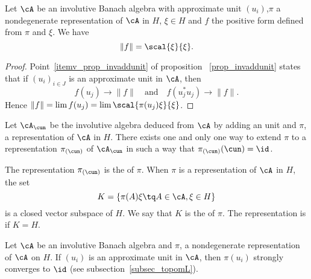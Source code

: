 \begin{proposition}
Let $\cA$ be an involutive Banach algebra with approximate unit $(u_i)$,$\pi$ a nondegenerate representation of $\cA$ in $H$, $\xi\in H$ and $f$ the positive form defined from $\pi$ and $\xi$. We have
\begin{equation}
\| f \|=\scal{ \xi }{ \xi }.
\end{equation}
\end{proposition}

\begin{proof}
Point~\ref{itemv_prop_invaddunit} of proposition ~\ref{prop_invaddunit} states that if $(u_i)_{i\in J}$ is an approximate unit in $\cA$, then
\[
  f(u_j)\to\| f \|\quad\text{and}\quad f(u_j^*u_j)\to \| f \|.
\]
Hence $\| f \|=\lim f(u_j)=\lim\scal{ \pi(u_j)\xi }{ \xi }$.

\end{proof}

\begin{proposition}
Let $\cA_{\cun}$ be the involutive algebra deduced from $\cA$ by adding an unit and $\pi$, a representation of $\cA$ in $H$. There exists one and only one way to extend $\pi$ to a representation $\pi_{(\cun)}$ of $\cA_{\cun}$ in such a way that $\pi_{(\cun)}(\cun)=\id$.
\end{proposition}
The representation $\pi_{(\cun)}$ is the  of $\pi$. When $\pi$ is a representation of $\cA$ in $H$, the set
\begin{equation}
 K=\{ \pi(A)\xi\tq A\in\cA,\xi\in H \}
\end{equation}
is a closed vector subspace of $H$. We say that $K$ is the  of $\pi$. The representation is  if $K=H$.

\begin{proposition}
Let $\cA$ be an involutive Banach algebra and $\pi$, a nondegenerate representation of $\cA$ on $H$. If $(u_i)$ is an approximate unit in $\cA$, then $\pi(u_i)$ strongly converges to $\id$ (see subsection~\ref{subsec_topomL}).
\end{proposition}

